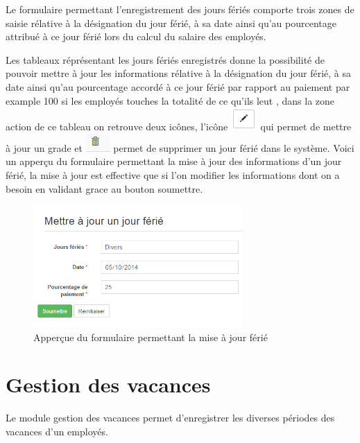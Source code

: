 \documentclass[12pt,a4paper]{report}
\begin{document}
Le formulaire permettant l'enregistrement des jours fériés comporte trois zones de saisie rélative à la désignation du jour férié, à sa date ainsi qu'au pourcentage attribué à ce jour férié lors du calcul du salaire des employés.

Les tableaux réprésentant les jours fériés enregistrés donne la possibilité de pouvoir mettre à jour les informations rélative à la désignation du jour férié, à sa date ainsi qu'au pourcentage accordé à ce jour férié par rapport au paiement par example 100 si les employés touches la totalité de ce qu'ils leut , dans la zone action de ce tableau on retrouve deux icônes, l'icône \includegraphics[scale=0.7]{pic/EditBlack.png} qui permet de mettre à jour un grade et \includegraphics[scale=0.7]{pic/DeleteWRed.png} permet de supprimer un jour férié dans le système.
Voici un apperçu du formulaire permettant la mise à jour des informations d'un jour férié, la mise à jour est effective que si l'on modifier les informations dont on a besoin en validant grace au bouton soumettre. 

\begin{figure}[h]
\begin{center}
\includegraphics[width=8cm]{pic/UpdateOfDy.png}
\end{center}
\caption{Apperçue du formulaire permettant la mise à jour férié}
\label{Apperçue du formulaire permettant la mise à jour férié}
\end{figure} 
\newpage
\section{Gestion des vacances}
Le module gestion des vacances permet d'enregistrer les diverses périodes des vacances d'un employés.
\end{document}
